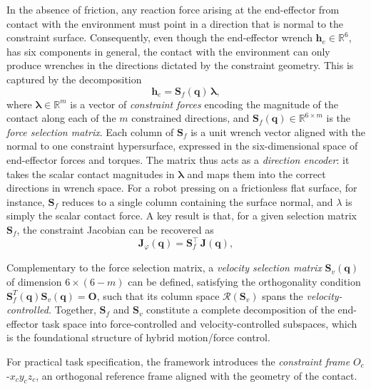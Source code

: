 \documentclass[
	german,%
	accentcolor=9c,%
	ruledheaders=section,%
	class=report,%
	thesis={type=bachelor},%
	fontsize=11pt,%
	parskip=half-,%
	custommargins=true,%
	marginpar=false,%
]{tudapub}
\begin{document}
In the absence of friction, any reaction force arising at the end-effector from contact with
the environment must point in a direction that is normal to the constraint surface. Consequently, even though the end-effector wrench $\boldsymbol{h}_e \in \mathbb{R}^6$,
has six components in general, the contact with the environment can only produce wrenches in the directions dictated by the constraint geometry. This is captured by the decomposition
\begin{equation}
    \boldsymbol{h}_e = \boldsymbol{S}_f(\boldsymbol{q})\,\boldsymbol{\lambda},
    \label{eq:reaction_force}
\end{equation}
where $\boldsymbol{\lambda} \in \mathbb{R}^m$ is a vector of \emph{constraint
forces} encoding the magnitude of the contact along each of the $m$ constrained directions,
and $\boldsymbol{S}_f(\boldsymbol{q}) \in \mathbb{R}^{6 \times m}$ is the
\emph{force selection matrix}.
Each column of $\boldsymbol{S}_f$ is a unit wrench vector aligned with the normal to one
constraint hypersurface, expressed in the six-dimensional space of end-effector forces and
torques. The matrix thus acts as a \emph{direction encoder}: it takes the scalar contact
magnitudes in $\boldsymbol{\lambda}$ and maps them into the correct directions in wrench
space. For a robot pressing on a frictionless flat surface, for instance, $\boldsymbol{S}_f$
reduces to a single column containing the surface normal, and $\lambda$ is simply the
scalar contact force. A key result is that, for a given selection matrix $\mathbf{S}_{f}$, the constraint
Jacobian can be recovered as
%
\begin{equation}
    \mathbf{J}_{\varphi}(\mathbf{q}) = \mathbf{S}_{f}^{\top}\,\mathbf{J}(\mathbf{q}),
    \label{eq:constraint_jacobian_from_selection}
\end{equation}
%

Complementary to the force selection matrix, a \emph{velocity selection matrix} $\boldsymbol{S}_v(\boldsymbol{q})$ of dimension $6 \times (6 - m)$ can be defined, satisfying the orthogonality condition $\boldsymbol{S}_f^T(\boldsymbol{q})\boldsymbol{S}_v(\boldsymbol{q}) = \boldsymbol{O}$, such that its column space $\mathcal{R}(\boldsymbol{S}_v)$ spans the \emph{velocity-controlled.} Together, $\boldsymbol{S}_f$ and $\boldsymbol{S}_v$ constitute a complete decomposition of the end-effector task space into force-controlled and velocity-controlled subspaces, which is the foundational structure of hybrid motion/force control.

For practical task specification, the framework introduces the \emph{constraint frame} $O_c$-$x_cy_cz_c$, an orthogonal reference frame aligned with the geometry of the contact.
\end{document}
